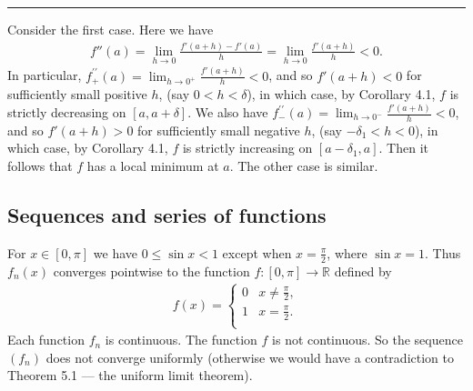 \documentclass[letterpaper,10pt,english]{jupyterBook}
\begin{document}
\bigskip\hrule\bigskip


\sphinxAtStartPar
{\hyperref[\detokenize{Problems:id53}]{}} Consider the first case. Here we have
\begin{equation*}
\begin{split}
f''(a) = \lim_{h \rightarrow 0}\frac{f'(a + h) - f'(a)}{h} =  \lim_{h \rightarrow 0}\frac{f'(a + h)}{h} < 0.
\end{split}
\end{equation*}
\sphinxAtStartPar
In particular, \(f^{\prime \prime}_{+}(a) = \lim_{h \rightarrow 0^+}\frac{f'(a + h)}{h} < 0\), and so \(f'(a + h) < 0\) for sufficiently small positive \(h\), (say \(0 < h < \delta\)), in which case, by Corollary 4.1, \(f\) is strictly decreasing on \([a,  a + \delta]\). We also have \(f^{\prime \prime}_{-}(a) = \lim_{h \rightarrow 0^-}\frac{f'(a + h)}{h} < 0\), and so \(f'(a + h) > 0\) for sufficiently small negative \(h\), (say \(-\delta_{1} < h < 0\)), in which case, by Corollary 4.1, \(f\) is strictly increasing on \([a- \delta_{1}, a]\). Then it follows that \(f\) has a local minimum at \(a\). The other case is similar.


\subsection{Sequences and series of functions}
\label{\detokenize{Solutions-full:sequences-and-series-of-functions}}\label{\detokenize{Solutions-full:ch5sol}}
\sphinxAtStartPar
{\hyperref[\detokenize{Problems:id54}]{}} For \(x\in [0,\pi ]\) we have \(0\leq \sin x<1\) except when \(x=\frac{\pi}{2}\), where \(\sin x=1\). Thus \(f_n(x)\) converges pointwise to the function \(f\colon [0, \pi ]\rightarrow \mathbb{R}\) defined by
\begin{equation*}
\begin{split}
f(x) = \left\{ \begin{array}{ll}
0 & x\neq \frac{\pi}{2}, \\
1 & x=\frac{\pi}{2}. \\
\end{array} \right.
\end{split}
\end{equation*}
\sphinxAtStartPar
Each function \(f_n\) is continuous. The function \(f\) is not continuous. So the sequence \((f_n)\) does not converge uniformly (otherwise we would have a contradiction to Theorem 5.1 — the uniform limit theorem).
\end{document}

